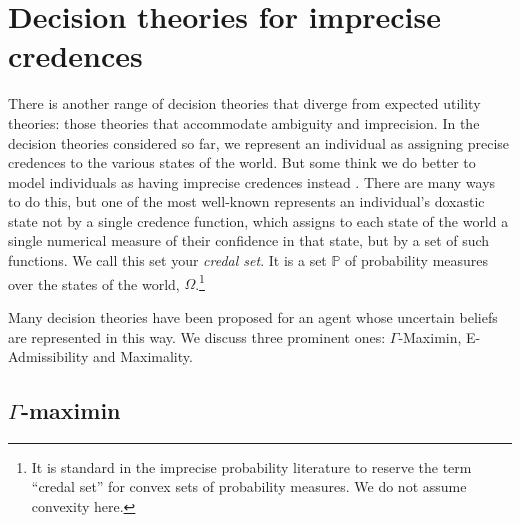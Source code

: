\documentclass[a4paper,final]{article}
\renewcommand\P{\mathbb{P}} %
\newcommand{\IP}{\P}
\newcommand{\todoold}[2][]{\todo[backgroundcolor=white,bordercolor=orange!10,linecolor=gray!10, #1,caption={},textcolor=gray]{Pre-rev: #2}}
\newenvironment{CCM rewritten}
{\begingroup\color{blue}} %
{\endgroup}              %
\begin{document}
\section{Decision theories for imprecise credences}

There is another range of decision theories that diverge from expected utility theories: those theories that accommodate ambiguity and imprecision. In the decision theories considered so far, we represent an individual as assigning precise credences to the various states of the world. But some think we do better to model individuals as having imprecise credences instead \citep{walley1991srip, bradley2016ip}. There are many ways to do this, but one of the most well-known represents an individual's doxastic state not by a single credence function, which assigns to each state of the world a single numerical measure of their confidence in that state, but by a set of such functions. We call this set your \emph{credal set}. It is a set $\IP$ of probability measures over the states of the world, $\Omega$.\footnote{{It is standard in the imprecise probability literature to reserve the term ``credal set'' for convex sets of probability measures. We do not assume convexity here.}}


Many decision theories have been proposed for an agent whose uncertain beliefs are represented in this way. We discuss three prominent ones: $\Gamma$-Maximin, E-Admissibility and Maximality. %



\subsection{$\Gamma$-maximin}\label{sect:gamma}
\end{document}
